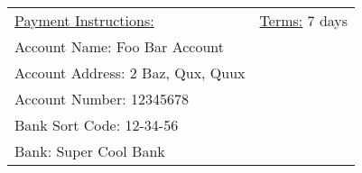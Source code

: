 \documentclass{letter}
\begin{document}
\vspace{3 cm}

\begin{tabularx}{\linewidth}{X r}
    \underline{Payment Instructions:} \hspace*{\fill} & \underline{Terms:} 7 days \\
    Account Name: Foo Bar Account                                                   \\Account Address: 2 Baz, Qux, Quux \\Account Number: 12345678 \\Bank Sort Code: 12-34-56 \\Bank: Super Cool Bank
\end{tabularx}
\end{document}
